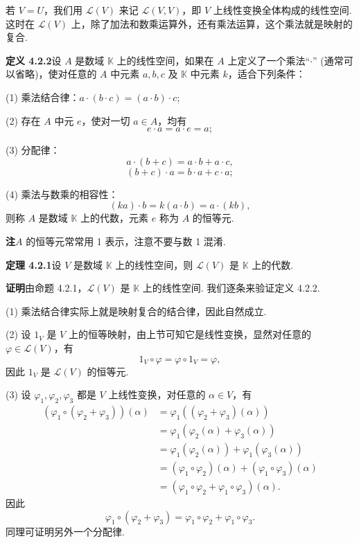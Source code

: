 \documentclass[UTF8,12pt,a4paper,fontset=fandol]{ctexart}
\begin{document}
若 $V=U$，我们用 $\mathcal{L}(V)$ 来记 $\mathcal{L}(V,V)$，即 $V$ 上线性变换全体构成的线性空间. 这时在 $\mathcal{L}(V)$ 上，除了加法和数乘运算外，还有乘法运算，这个乘法就是映射的复合.

\noindent\textbf{定义 4.2.2}\quad 设 $A$ 是数域 $\mathbb{K}$ 上的线性空间，如果在 $A$ 上定义了一个乘法“$\cdot$” (通常可以省略)，使对任意的 $A$ 中元素 $a,b,c$ 及 $\mathbb{K}$ 中元素 $k$，适合下列条件：

(1) 乘法结合律：$a\cdot(b\cdot c)=(a\cdot b)\cdot c$;

(2) 存在 $A$ 中元 $e$，使对一切 $a\in A$，均有
\[
e\cdot a=a\cdot e=a;
\]

(3) 分配律：
\[
a\cdot(b+c)=a\cdot b+a\cdot c,
\]
\[
(b+c)\cdot a=b\cdot a+c\cdot a;
\]

(4) 乘法与数乘的相容性：
\[
(ka)\cdot b=k(a\cdot b)=a\cdot(kb),
\]
则称 $A$ 是数域 $\mathbb{K}$ 上的代数，元素 $e$ 称为 $A$ 的恒等元.

\noindent\textbf{注}\quad $A$ 的恒等元常常用 1 表示，注意不要与数 1 混淆.

\noindent\textbf{定理 4.2.1}\quad 设 $V$ 是数域 $\mathbb{K}$ 上的线性空间，则 $\mathcal{L}(V)$ 是 $\mathbb{K}$ 上的代数.

\noindent\textbf{证明}\quad 由命题 4.2.1，$\mathcal{L}(V)$ 是 $\mathbb{K}$ 上的线性空间. 我们逐条来验证定义 4.2.2.

(1) 乘法结合律实际上就是映射复合的结合律，因此自然成立.

(2) 设 $1_V$ 是 $V$ 上的恒等映射，由上节可知它是线性变换，显然对任意的 $\varphi\in\mathcal{L}(V)$，有
\[
1_V\circ\varphi=\varphi\circ 1_V=\varphi,
\]
因此 $1_V$ 是 $\mathcal{L}(V)$ 的恒等元.

(3) 设 $\varphi_1,\varphi_2,\varphi_3$ 都是 $V$ 上线性变换，对任意的 $\alpha\in V$，有
\[
\begin{aligned}
(\varphi_1\circ(\varphi_2+\varphi_3))(\alpha)
&=\varphi_1((\varphi_2+\varphi_3)(\alpha))\\
&=\varphi_1(\varphi_2(\alpha)+\varphi_3(\alpha))\\
&=\varphi_1(\varphi_2(\alpha))+\varphi_1(\varphi_3(\alpha))\\
&=(\varphi_1\circ\varphi_2)(\alpha)+(\varphi_1\circ\varphi_3)(\alpha)\\
&=(\varphi_1\circ\varphi_2+\varphi_1\circ\varphi_3)(\alpha).
\end{aligned}
\]
因此
\[
\varphi_1\circ(\varphi_2+\varphi_3)=\varphi_1\circ\varphi_2+\varphi_1\circ\varphi_3.
\]
同理可证明另外一个分配律.
\end{document}
